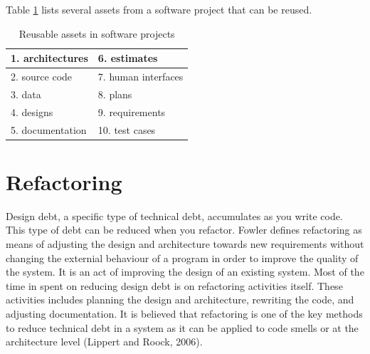 Table \ref{tab:reusableComponents} lists several assets from a software project that can be reused\cite{frakes1996software}.

\begin{table}[H]
	\centering
	\begin{tabular}{ | l | l |}
	\hline
	1. architectures & 6. estimates \\ \hline
	2. source code & 7. human interfaces \\ \hline
	3. data & 8. plans \\ \hline
	4. designs & 9. requirements \\ \hline
	5. documentation & 10. test cases \\
	\hline
	\end{tabular}
	\caption{Reusable assets in software projects} \label{tab:reusableComponents}
\end{table}




\section{Refactoring}
Design debt, a specific type of technical debt, accumulates as you write code\cite{Zazworka:2011:PDD:1985362.1985372}. This type of debt can be reduced when you refactor. Fowler defines refactoring as means of adjusting the design and architecture towards new requirements without changing the externial behaviour of a program in order to improve the quality of the system\cite{1999:RID:311424}. It is an act of improving the design of an existing system\cite{Vliet:2008:SEP:1481475}. Most of the time in spent on reducing design debt is on refactoring activities itself. These activities includes planning the design and architecture, rewriting the code, and adjusting documentation\cite{Pressman:2009:SEP:1593949}. It is believed that refactoring is one of the key methods to reduce technical debt in a system as it can be applied to code smells or at the architecture level (Lippert and Roock, 2006).  




